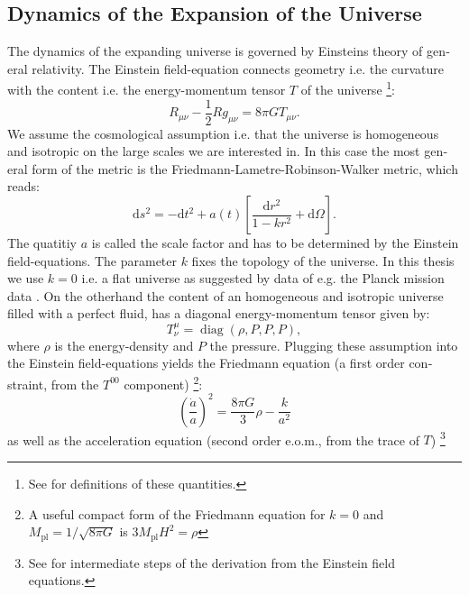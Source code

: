 \documentclass[master,       %
               twoside,        %
               BCOR10mm,       %
               english,ngerman, %
               ]{GAUBM}
\begin{document}
\begin{otherlanguage}{english}
\subsection{Dynamics of the Expansion of the Universe}
\label{sec:dynamics_of_the_examsion_of_the_universe}
The dynamics of the expanding universe is governed by Einsteins theory of general relativity. The Einstein field-equation connects geometry i.e. the curvature with the content i.e. the energy-momentum tensor $T$ of the universe \footnote{
See \cite{carroll_spacetime_and_geometry_2019} for definitions of these quantities.
}:
\begin{equation}
	R_{\mu \nu} - \frac{1}{2} R g_{\mu \nu} = 8 \pi G T_{\mu \nu}.
\end{equation}
We assume the cosmological assumption i.e. that the universe is homogeneous and isotropic on the large scales we are interested in. In this case the most general form of the metric is the Friedmann-Lametre-Robinson-Walker metric, which reads:
\begin{equation}
	\mathrm{d} s^2 = - \mathrm{d} t^2 + a(t) \left[ \frac{\mathrm{d} r^2}{1 - kr^2} + \mathrm{d} \Omega \right].
\end{equation}
The quatitiy $a$ is called the scale factor and has to be determined by the Einstein field-equations.
The parameter $k$ fixes the topology of the universe. In this thesis we use $k = 0$ i.e. a flat universe as suggested by data of e.g. the Planck mission data \cite{planck2018}.
On the otherhand the content of an homogeneous and isotropic universe filled with a perfect fluid, has a diagonal energy-momentum tensor given by:
\begin{equation}
	T_\nu^\mu = \operatorname{diag}(\rho, P, P, P),
\end{equation}
where $\rho$ is the energy-density and $P$ the pressure.
Plugging these assumption into the Einstein field-equations yields the Friedmann equation (a first order constraint, from the $T^{00}$ component) \footnote{
A useful compact form of the Friedmann equation for $k = 0$ and $M_\mathrm{pl} = 1 / \sqrt{8 \pi G}$ is $3 M_\mathrm{pl} H^2 = \rho$
}:
\begin{equation}
	\label{eq:friedmann_equation}
	\boxed{
	\left( \frac{\dot{a}}{a} \right)^2 = \frac{8 \pi G}{3} \rho - \frac{k}{a^2}
	}
\end{equation}
as well as the acceleration equation (second order e.o.m., from the trace of $T$) \footnote{
See \cite[sec. 2.1, 3.1]{the_early_universe_kolb_and_turner} for intermediate steps of the derivation from the Einstein field equations.
}
\end{otherlanguage}
\end{document}
